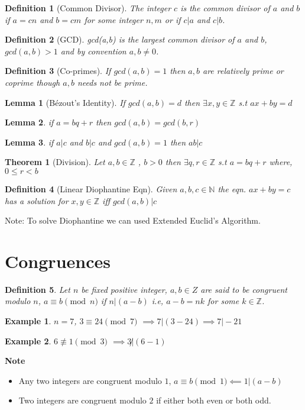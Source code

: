 \documentclass[12pt,a4paper]{article}
\newcommand{\Z}{\mathbb{Z}}
\newcommand{\N}{\mathbb{N}}
\newtheorem{thm}{Theorem}
\newtheorem{defn}{Definition}
\newtheorem{lem}{Lemma}
\newtheorem{ex}{Example}
\begin{document}
\begin{defn}[Common Divisor]\normalfont
	The integer $c$ is the common divisor of $a$ and $b$ if $a=cn$ and $b=cm$ for some integer $n,m$ or if $c|a$ and $c|b$.
\end{defn}
\begin{defn}[GCD]\normalfont
	gcd(a,b) is the largest common divisor of $a$ and $b$, $gcd(a,b)>1$ and by convention $a,b \ne 0$.
\end{defn}
\begin{defn}[Co-primes]\normalfont
	If $gcd(a,b)=1$ then $a,b$ are relatively prime or coprime though $a,b$ needs not be prime.
\end{defn}

\begin{lem}[B\'ezout's Identity]\normalfont
	If $gcd(a,b)=d$ then $ \exists x,y \in \Z$ s.t $ax+by=d$
\end{lem}
\begin{lem}\normalfont
	if $a=bq+r$ then $gcd(a,b)=gcd(b,r)$
\end{lem}
\begin{lem}\normalfont
	if $a|c$ and $b|c$ and $gcd(a,b)=1$ then $ab|c$
\end{lem}
\begin{thm}[Division]\normalfont
	Let $a,b \in \Z$ , $b>0$ then $\exists q,r \in \Z$ s.t $a=bq+r$ where, $0\le r < b$
\end{thm}
 
\begin{defn}[Linear Diophantine Eqn]\normalfont
	Given $a,b,c \in \N $ the eqn. $ax+by=c$ has a solution for $x,y \in \Z$ iff $gcd(a,b)|c$
\end{defn} 
 Note: To solve Diophantine we can used Extended Euclid's Algorithm.
\section{Congruences}
\begin{defn}\normalfont
	Let $n$ be fixed positive integer, $a,b \in Z$ are said to be congruent modulo $n$, $a \equiv b \pmod n$ if $n|(a-b)$ i.e, $a-b = nk$ for some $k \in \Z$.
\end{defn}
\begin{ex}
	$n=7$, $3 \equiv 24 \pmod 7$ $\implies 7|(3-24) \implies 7|-21$
\end{ex}
\begin{ex}
 $6 \not \equiv 1 \pmod 3$ $\implies 3 \not |(6-1) $
\end{ex}

\textbf{Note}
\begin{itemize}
	\item Any two integers are congruent modulo $1$, $a\equiv b \pmod 1 \impliedby 1|(a-b)$
	\item Two integers are congruent modulo $2$ if either both even or both odd.
\end{itemize}
\end{document}
